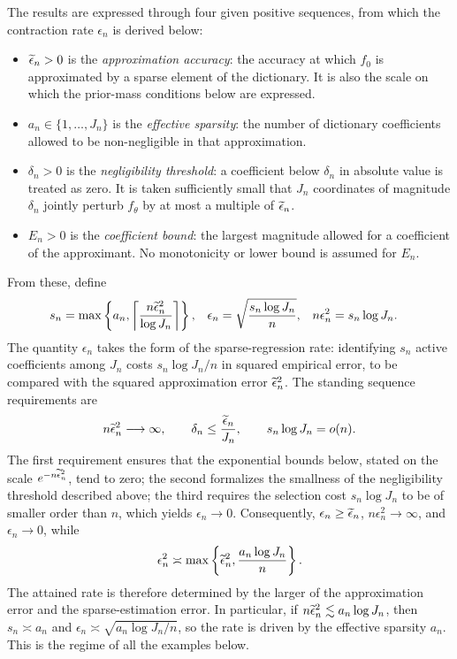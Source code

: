 The results are expressed through four given positive sequences, from which the contraction rate $\epsilon_n$ is derived below:
\begin{itemize}

\item $\widetilde{\epsilon}_n>0$ is the \emph{approximation accuracy}: the accuracy at which $f_0$ is approximated by a sparse element of the dictionary. It is also the scale on which the prior-mass conditions below are expressed.
\item $a_n\in\{1,\ldots,J_n\}$ is the \emph{effective sparsity}: the number of dictionary coefficients allowed to be non-negligible in that approximation.
\item $\delta_n>0$ is the \emph{negligibility threshold}: a coefficient below $\delta_n$ in absolute value is treated as zero. It is taken sufficiently small that $J_n$ coordinates of magnitude $\delta_n$ jointly perturb $f_\theta$ by at most a multiple of $\widetilde{\epsilon}_n$.
\item $E_n>0$ is the \emph{coefficient bound}: the largest magnitude allowed for a coefficient of the approximant. No monotonicity or lower bound is assumed for $E_n$.

\end{itemize}
From these, define
\begin{align}
s_n&=\max\left\{a_n,\left\lceil\frac{n\widetilde{\epsilon}_n^2}{\log J_n}\right\rceil\right\},
&\epsilon_n&=\sqrt{\frac{s_n\log J_n}{n}},
&n\epsilon_n^2&=s_n\log J_n. \label{sparsity}
\end{align}
The quantity $\epsilon_n$ takes the form of the sparse-regression rate: identifying $s_n$ active coefficients among $J_n$ costs $s_n\log J_n/n$ in squared empirical error, to be compared with the squared approximation error $\widetilde{\epsilon}_n^2$. The standing sequence requirements are
\begin{align}
n\widetilde{\epsilon}_n^2\longrightarrow\infty,
\qquad
\delta_n\leq\frac{\widetilde{\epsilon}_n}{J_n},
\qquad
s_n\log J_n=o(n). \label{eq:standing-sequences}
\end{align}
The first requirement ensures that the exponential bounds below, stated on the scale $e^{-n\widetilde{\epsilon}_n^2}$, tend to zero; the second formalizes the smallness of the negligibility threshold described above; the third requires the selection cost $s_n\log J_n$ to be of smaller order than $n$, which yields $\epsilon_n\to0$. Consequently, $\epsilon_n\geq\widetilde{\epsilon}_n$, $n\epsilon_n^2\to\infty$, and $\epsilon_n\to0$, while
\begin{align}
\epsilon_n^2\asymp\max\left\{\widetilde{\epsilon}_n^2,\frac{a_n\log J_n}{n}\right\}. \label{eq:two-rates}
\end{align}
The attained rate is therefore determined by the larger of the approximation error and the sparse-estimation error. In particular, if $n\widetilde{\epsilon}_n^2\lesssim a_n\log J_n$, then $s_n\asymp a_n$ and $\epsilon_n\asymp\sqrt{a_n\log J_n/n}$, so the rate is driven by the effective sparsity $a_n$. This is the regime of all the examples below.

